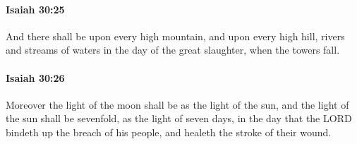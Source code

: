 		\paragraph{Isaiah 30:25} %
			\label{ISAIAH-30-25}

			And there shall be upon every high mountain, and upon every high hill, rivers and streams of waters in the day of the great slaughter, when the towers fall.


		\paragraph{Isaiah 30:26} %
			\label{ISAIAH-30-26}

			Moreover the light of the moon shall be as the light of the sun, and the light of the sun shall be sevenfold, as the light of seven days, in the day that the LORD bindeth up the breach of his people, and healeth the stroke of their wound.

